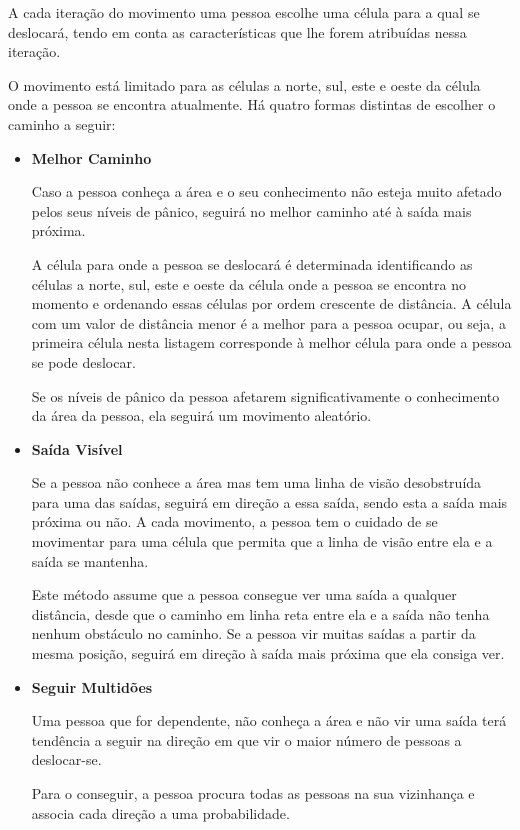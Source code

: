 \documentclass[12pt]{article}
\begin{document}
\begin{titlepage}
\begin{itemize}
A cada iteração do movimento uma pessoa escolhe uma célula para a qual se deslocará, tendo em conta as características que lhe forem atribuídas nessa iteração.

O movimento está limitado para as células a norte, sul, este e oeste da célula onde a pessoa se encontra atualmente. Há quatro formas distintas de escolher o caminho a seguir:
\begin{itemize}

\item \textbf{Melhor Caminho}

Caso a pessoa conheça a área e o seu conhecimento não esteja muito afetado pelos seus níveis de pânico, seguirá no melhor caminho até à saída mais próxima. 

A célula para onde a pessoa se deslocará é determinada identificando as células a norte, sul, este e oeste da célula onde a pessoa se encontra no momento e ordenando essas células por ordem crescente de distância. A célula com um valor de distância menor é a melhor para a pessoa ocupar, ou seja, a primeira célula nesta listagem corresponde à melhor célula para onde a pessoa se pode deslocar.

Se os níveis de pânico da pessoa afetarem significativamente o conhecimento da área da pessoa, ela seguirá um movimento aleatório.

\item \textbf{Saída Visível}

Se a pessoa não conhece a área mas tem uma linha de visão desobstruída para uma das saídas, seguirá em direção a essa saída, sendo esta a saída mais próxima ou não. A cada movimento, a pessoa tem o cuidado de se movimentar para uma célula que permita que a linha de visão entre ela e a saída se mantenha.

Este método assume que a pessoa consegue ver uma saída a qualquer distância, desde que o caminho em linha reta entre ela e a saída não tenha nenhum obstáculo no caminho. Se a pessoa vir muitas saídas a partir da mesma posição, seguirá em direção à saída mais próxima que ela consiga ver.

\item \textbf{Seguir Multidões}

Uma pessoa que for dependente, não conheça a área e não vir uma saída terá tendência a seguir na direção em que vir o maior número de pessoas a deslocar-se.

Para o conseguir, a pessoa procura todas as pessoas na sua vizinhança e associa cada direção a uma probabilidade.


\end{itemize}
\end{itemize}
\end{titlepage}
\end{document}
